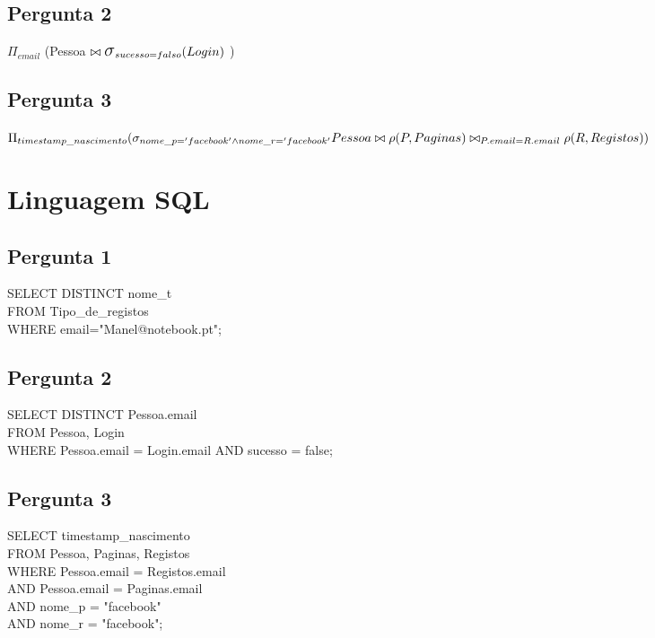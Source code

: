 \documentclass[11pt,a4paper]{article}
\newcommand{\select}{\mbox{\Large$\sigma$}}
\begin{document}
\subsection{Pergunta 2}

$\Pi_{email}$ (Pessoa $ \bowtie \select_{sucesso=falso} (Login)$ )

\subsection{Pergunta 3}

$\Pi_{timestamp\_nascimento}(\sigma_{nome\_p = 'facebook' \wedge nome\_r = 'facebook'} Pessoa \bowtie 
\\\rho( P, Paginas) \bowtie_{P.email = R.email} \rho( R, Registos)) $

\section{Linguagem SQL}
\subsection{Pergunta 1}
SELECT DISTINCT nome\_t
\\FROM Tipo\_de\_registos
\\WHERE email="Manel@notebook.pt";

\subsection{Pergunta 2}
SELECT DISTINCT Pessoa.email 
\\FROM Pessoa, Login 
\\WHERE Pessoa.email = Login.email AND sucesso = false;

\subsection{Pergunta 3}
SELECT timestamp\_nascimento
\\FROM Pessoa, Paginas, Registos 
\\WHERE Pessoa.email = Registos.email 
\\AND Pessoa.email = Paginas.email 
\\AND nome\_p = "facebook" 
\\AND nome\_r = "facebook";
\end{document}
